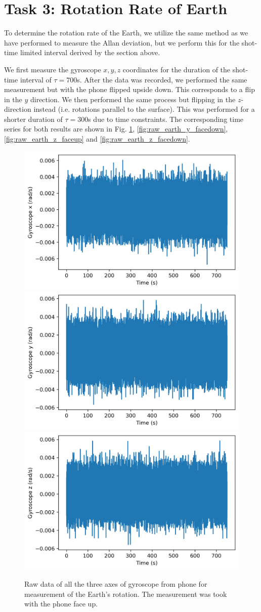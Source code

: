 \documentclass[a4paper]{report}
\numberwithin{equation}{section}
\begin{document}
\section{Task 3: Rotation Rate of Earth}

To determine the rotation rate of the Earth, we utilize the same method as we have performed to measure the Allan deviation, but we 
perform this for the shot-time limited interval derived by the section above. \par 

We first measure the gyroscope $x, y, z$ coordinates for the duration of the shot-time interval of $\tau = 700$s. After the data was recorded,
we performed the same measurement but with the phone flipped upside down. This corresponds to a flip in the $y$ direction. 
We then performed the same process but flipping in the $z$-direction instead (i.e. rotations parallel to the surface). This was performed for a 
shorter duration of $\tau = 300$s due to time constraints. The corresponding time series for both results are shown in Fig. \ref{fig:raw_earth_y_faceup}, \ref{fig:raw_earth_y_facedown}, \ref{fig:raw_earth_z_faceup} and \ref{fig:raw_earth_z_facedown}.


\begin{figure}[hbt!]
     \centering
	 {{\includegraphics[width=0.4\columnwidth]{raw_ftx.png}}}
	 {{\includegraphics[width=0.4\columnwidth]{raw_fty.png}}}
	 {{\includegraphics[width=0.4\columnwidth]{raw_ftz.png}}}

     \caption{Raw data of all the three axes of gyroscope from phone for measurement of the Earth's rotation.
               The measurement was took with the phone face up. }
	 \label{fig:raw_earth_y_faceup}
\end{figure}
\end{document}

